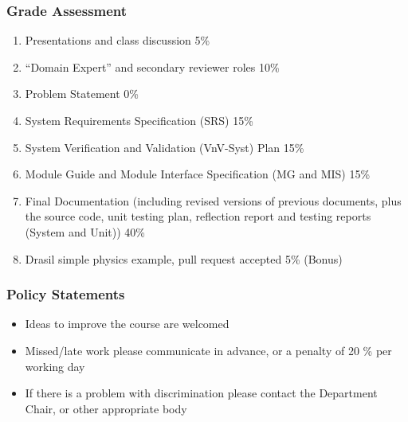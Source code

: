 \documentclass[t,12pt,numbers,fleqn]{beamer}
\begin{document}
\begin{frame}
\frametitle{Grade Assessment}

\begin {enumerate}

\item Presentations and class discussion 5\%

\item ``Domain Expert'' and secondary reviewer roles 10\%

\item Problem Statement 0\%

\item System Requirements Specification (SRS) 15\%

\item System Verification and Validation (VnV-Syst) Plan 15\%

\item Module Guide and Module Interface Specification (MG and MIS) 15\%

\item Final Documentation (including revised versions of previous documents,
  plus the source code, unit testing plan, reflection report and testing
  reports (System and Unit)) 40\%

\item Drasil simple physics example, pull request accepted 5\% (Bonus)

\end {enumerate}

\end{frame}


\begin{frame}
\frametitle{Policy Statements}

\begin {itemize}

\item Ideas to improve the course are welcomed
\item Missed/late work please communicate in advance, or a penalty of 20 \% per
  working day
\item If there is a problem with discrimination please contact the Department
  Chair, or other appropriate body

\end{itemize}

\end{frame}

\end{document}
